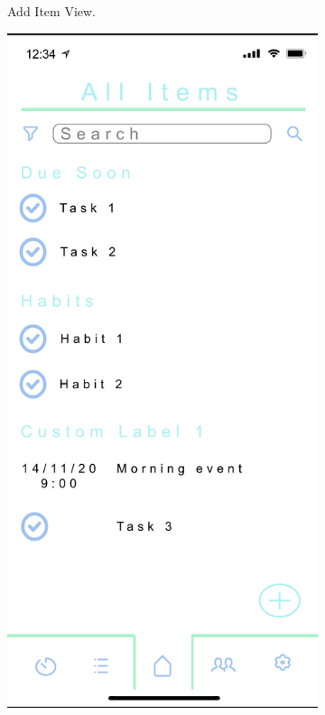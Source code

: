 \begin{figure}[H]
\begin{subfigure}[b]{0.3\textwidth}
        \caption{Add Item View.}
        \label{fig:add_item_colour}
    \end{subfigure}
    \hfill
    \begin{subfigure}[b]{0.3\textwidth}
        \centering
        \includegraphics[width=\textwidth]{./graphics/design/All Items Colour.png}

\end{subfigure}
\end{figure}
